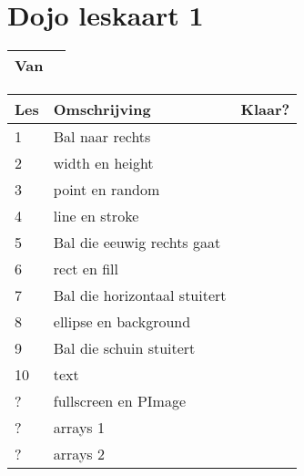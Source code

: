 \documentclass{article}
\begin{document}
\section*{
  \Huge
  Dojo leskaart 1
}

\begin{table}[!htbp]
  \Huge
  \centering 
  \begin{tabularx}{\textwidth}{ | l | p{9.85cm} | }
    \hline
    Van &  \\
    \hline
  \end{tabularx}
\end{table}


\begin{table}[!htbp]
  \LARGE
  \centering 
  \begin{tabularx}{\textwidth}{ | l | l | l | }
    \hline
    Les & Omschrijving & Klaar? \\
    \hline
    \hline
    1 & Bal naar rechts & \\
    2 & width en height & \\
    3 & point en random & \\
    4 & line en stroke & \\
    5 & Bal die eeuwig rechts gaat & \\
    6 & rect en fill & \\
    7 & Bal die horizontaal stuitert & \\
    8 & ellipse en background & \\
    9 & Bal die schuin stuitert & \\
    10 & text & \\
    ? & fullscreen en PImage & \\
    ? & arrays 1 & \\
    ? & arrays 2 & \\
    \hline
  \end{tabularx}
\end{table}
\end{document}

